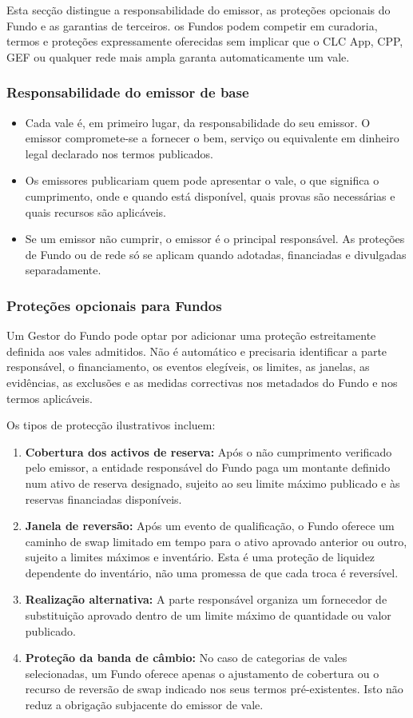 \documentclass[11pt]{article}
\begin{document}
Esta secção distingue a responsabilidade do emissor, as proteções opcionais do Fundo e as garantias de terceiros. os Fundos podem competir em curadoria, termos e proteções expressamente oferecidas sem implicar que o CLC App, CPP, GEF ou qualquer rede mais ampla garanta automaticamente um vale.

\subsubsection*{Responsabilidade do emissor de base}

\begin{itemize}[leftmargin=*]
\item Cada vale é, em primeiro lugar, da responsabilidade do seu emissor. O emissor compromete-se a fornecer o bem, serviço ou equivalente em dinheiro legal declarado nos termos publicados.
\item Os emissores publicariam quem pode apresentar o vale, o que significa o cumprimento, onde e quando está disponível, quais provas são necessárias e quais recursos são aplicáveis.
\item Se um emissor não cumprir, o emissor é o principal responsável. As proteções de Fundo ou de rede só se aplicam quando adotadas, financiadas e divulgadas separadamente.
\end{itemize}
\subsubsection*{Proteções opcionais para Fundos}

Um Gestor do Fundo pode optar por adicionar uma proteção estreitamente definida aos vales admitidos. Não é automático e precisaria identificar a parte responsável, o financiamento, os eventos elegíveis, os limites, as janelas, as evidências, as exclusões e as medidas correctivas nos metadados do Fundo e nos termos aplicáveis.

Os tipos de protecção ilustrativos incluem:

\begin{enumerate}[leftmargin=*]
\item \textbf{Cobertura dos activos de reserva:} Após o não cumprimento verificado pelo emissor, a entidade responsável do Fundo paga um montante definido num ativo de reserva designado, sujeito ao seu limite máximo publicado e às reservas financiadas disponíveis.
\item \textbf{Janela de reversão:} Após um evento de qualificação, o Fundo oferece um caminho de swap limitado em tempo para o ativo aprovado anterior ou outro, sujeito a limites máximos e inventário. Esta é uma proteção de liquidez dependente do inventário, não uma promessa de que cada troca é reversível.
\item \textbf{Realização alternativa:} A parte responsável organiza um fornecedor de substituição aprovado dentro de um limite máximo de quantidade ou valor publicado.
\item \textbf{Proteção da banda de câmbio:} No caso de categorias de vales selecionadas, um Fundo oferece apenas o ajustamento de cobertura ou o recurso de reversão de swap indicado nos seus termos pré-existentes. Isto não reduz a obrigação subjacente do emissor de vale.
\end{enumerate}
\end{document}
